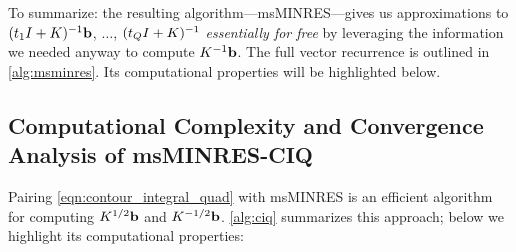 To summarize: the resulting algorithm---msMINRES---gives us approximations to $(t_1 I + K)^{-1} \mathbf{b}$, $\ldots$, $(t_Q I + K)^{-1}$ \emph{essentially for free} by leveraging the information we needed anyway to compute $K^{-1} \mathbf{b}$.
The full vector recurrence is outlined in \cref{alg:msminres}.
Its computational properties will be highlighted below.




\subsection{Computational Complexity and Convergence Analysis of msMINRES-CIQ}
Pairing \cref{eqn:contour_integral_quad} with msMINRES is an efficient algorithm for computing $K^{1/2} \mathbf{b}$ and $K^{-1/2} \mathbf{b}$.
\cref{alg:ciq} summarizes this approach; below we highlight its computational properties:

\label{sec:convergence}

